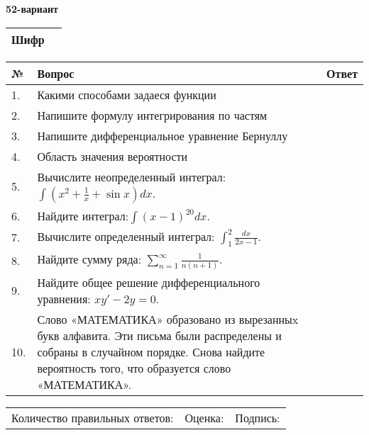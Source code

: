 \documentclass{article}
\begin{document}
  \egroup
  
  \newpage
  
  
  \textbf{52-вариант}\\
  
  \bgroup
  \def\arraystretch{1.6} %
  
  \begin{tabular}{|m{5.7cm}|m{9.5cm}|}
  \hline
  Шифр & \\
  \hline
  \end{tabular}
  
  \vspace{1cm}
  
  \begin{tabular}{|m{0.7cm}|m{10cm}|m{4cm}|}
  \hline
  № & Вопрос & Ответ \\
  \hline
  1. & Какими способами задаеся функции &  \\
  \hline
  2. & Напишите формулу интегрирования по частям &  \\
  \hline
  3. & Напишите дифференциальное уравнение Бернуллу &  \\
  \hline
  4. & Область значения вероятности &  \\
  \hline
  5. & Вычислите неопределенный интеграл: \(\int{\left( x^{2} + \frac{1}{x} + \sin x \right)dx}\). &  \\
  \hline
  6. & Найдите интеграл:\(\int{(x - 1)^{20}}dx\). &  \\
  \hline
  7. & Вычислите определенный интеграл: \(\int_{1}^{2}\frac{dx}{2x -1}\). &  \\
  \hline
  8. & Найдите сумму ряда: \(\sum_{n = 1}^{\infty}\frac{1}{n(n + 1)}\). &  \\
  \hline
  9. & Найдите общее решение дифференциального уравнения: \(xy' - 2y = 0\). &  \\
  \hline
  10. & Слово «МАТЕМАТИКА» образовано из вырезанныx букв алфавита. Эти письма были распределены и собраны в случайном порядке. Снова найдите вероятность того, что образуется слово «МАТЕМАТИКА». &  \\
  \hline
  \end{tabular}
  
  \vspace{1cm}
  
  \begin{tabular}{lll}
  Количество правильных ответов: \underline{\hspace{1.5cm}} & 
  Оценка: \underline{\hspace{1.5cm}} & 
  Подпись: \underline{\hspace{2cm}} \\
  \end{tabular}
  
\end{document}
